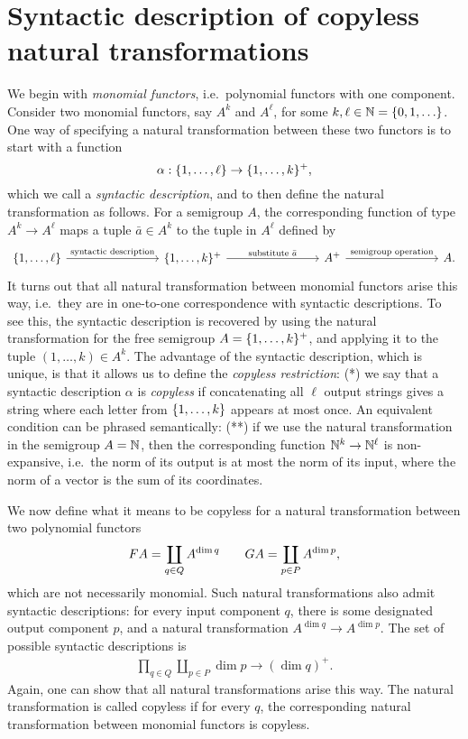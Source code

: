 \section{Syntactic description of copyless natural transformations}
We begin with \emph{monomial functors}, i.e.~polynomial functors with one component. 
Consider two monomial functors, say $A^k$ and $A^\ell$, for some  $k,\ell \in \mathbb{N} = \{0,1,\ldots\}$.
One way of specifying a natural transformation between these two functors is to start with a function 
\begin{equation}
\label{eq:syntactic-description}    \alpha : \{1,\ldots,\ell\} \to \{1,\ldots,k\}^+,
\end{equation}
which we call a \emph{syntactic description}, and to then  define the  natural transformation as follows. For a semigroup $A$, the corresponding function of type $A^k \to A^\ell$  maps a tuple $\bar a \in A^k$ to the tuple in $A^\ell$ defined by
\[
\begin{tikzcd}
    [column sep=2.8cm]
\set{1,\ldots,\ell}
\arrow[r, "\text{syntactic description}"]
&
\set{1,\ldots,k}^+ 
\ar[r,"\text{substitute $\bar a$}"]
& 
A^+
\ar[r,"\text{semigroup operation}"]
&
A.
\end{tikzcd}
\]
It turns out that all  natural transformation between monomial functors arise this way, i.e.~they are in one-to-one correspondence with syntactic descriptions. To see this, the syntactic description is recovered by using the natural transformation for the free semigroup $A=\{1,\ldots,k\}^+$, and applying it to the tuple $(1,\ldots,k) \in A^k$.
The advantage of the syntactic description, which is unique, is that it allows us to define the  \emph{copyless restriction}:  (*)   we say that a  syntactic description $\alpha$
is \emph{copyless} if concatenating all $\ell$ output strings gives a string where each letter from $\{1,\ldots,k\}$ appears at most once. An equivalent condition can be phrased semantically: (**) if we use the natural transformation in the semigroup $A = {\mathbb N}$, then the corresponding function ${\mathbb N}^k \to {\mathbb N}^\ell$ is non-expansive, i.e.\ the norm of its output is at most the norm of its input, where the norm of a vector is the sum of its coordinates. 

We now define what it means to be copyless for a natural transformation between two  polynomial functors 
\begin{align*}
\functor A = \coprod_{q \in Q} A^{\dim q} \qquad 
\functorg A = \coprod_{p \in P} A^{\dim p},
\end{align*}
which are not necessarily monomial. Such natural transformations also admit syntactic descriptions: for every input component $q$, there is some designated output component $p$, and a natural transformation $A^{\dim q} \to A^{\dim p}$.  The set of possible syntactic descriptions is
\begin{align*}
\prod_{q \in Q} \coprod_{p \in P} \dim p \to (\dim q)^+.
\end{align*}
Again, one can show that all natural transformations arise this way. The natural transformation is called copyless if for every $q$, the corresponding natural transformation between monomial functors is copyless. 
